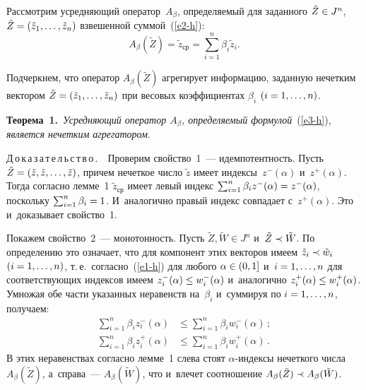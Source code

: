 \begin{multicols}{2}
Рассмотрим усредняющий оператор~$A_{\beta}$, определяемый для заданного 
$\tilde{Z}\hm\in J^n$, $\tilde{Z} \hm= (\tilde{z}_1,\ldots, \tilde{z}_n)$ 
взвешенной суммой~(\ref{e2-h}):
\begin{equation}
A_{\beta}(\tilde{Z}) = \tilde{z}_{\mathrm{ср}} =  \sum\limits_{i=1}^n\beta_i\tilde{z}_i.
\label{e3-h}
\end{equation}

Подчеркнем, что оператор $A_{\beta}(\tilde{Z})$ агрегирует информацию, заданную 
нечетким вектором $\tilde{Z} \hm= (\tilde{z}_1,\ldots,\tilde{z}_n)$ при весовых 
коэффициентах $\beta_i$ $(i\hm=1,\ldots,n)$.

\smallskip


\noindent
\textbf{Теорема~1.}\ \textit{Усредняющий оператор $A_{\beta}$, определяемый 
формулой}~(\ref{e3-h}), \textit{является  нечетким агрегатором}.

\smallskip

\noindent
Д\,о\,к\,а\,з\,а\,т\,е\,л\,ь\,с\,т\,в\,о\,.\ \  Проверим свойство~1~--- идемпотентность. Пусть 
$\tilde{Z}\hm=(\tilde{z}, \tilde{z},\ldots, \tilde{z})$, причем нечеткое чис\-ло 
$\tilde{z}$ имеет индексы~$z^{-}(\alpha)$ и~$z^{+}(\alpha)$. Тогда согласно 
лемме~1 $\tilde{z}_{\mathrm{ср}}$ имеет левый индекс 
$\sum\nolimits_{i=1}^n\beta_iz^{-}(\alpha) \hm= z^{-}(\alpha)$, поскольку 
$\sum\nolimits_{i=1}^n\beta_i\hm  = 1$. И~аналогично правый индекс совпадает 
с~$z^{+}(\alpha)$. Это и~доказывает свойство~1.

Покажем свойство~2~--- монотонность. Пусть $\tilde{Z}, \tilde{W}\in J^n$  и~$\tilde{Z}\hm\prec\tilde{W}$. 
По определению это означает, что для компонент этих 
векторов имеем $\tilde{z}_i\hm\prec\tilde{w}_i$ $(i\hm=1,\ldots,n)$, т.\,е.\ согласно~(\ref{e1-h}) 
для любого $\alpha\hm\in(0, 1]$ и~$i\hm=1,\ldots,n$ для соответствующих индексов 
имеем  $z^{-}_i(\alpha)\hm\leq w^{-}_i(\alpha)$ и~аналогично $z^{+}_i(\alpha)\hm\leq 
w^{+}_i(\alpha)$. Умножая обе части указанных неравенств на~$\beta_i$ и~суммируя 
по $i\hm=1,\ldots,n$, получаем:
\begin{align*}
\sum\limits_{i=1}^n\beta_iz^{-}_i(\alpha)&\leq\sum\limits_{i=1}^n\beta_iw^{-}_i(\alpha)\,;\\ 
\sum\limits_{i=1}^n\beta_iz^{+}_i(\alpha)&\leq\sum\limits_{i=1}^n\beta_iw^{+}_i(\alpha)\,.
\end{align*}
 В этих неравенствах согласно лемме~1 слева стоят $\alpha$-ин\-дек\-сы 
нечеткого чис\-ла $A_{\beta}(\tilde{Z})$, а~справа~---  $A_{\beta}(\tilde{W})$, что 
и~влечет соотношение $A_{\beta}(\tilde{Z})\hm\prec A_{\beta}(\tilde{W})$.


\end{multicols}
